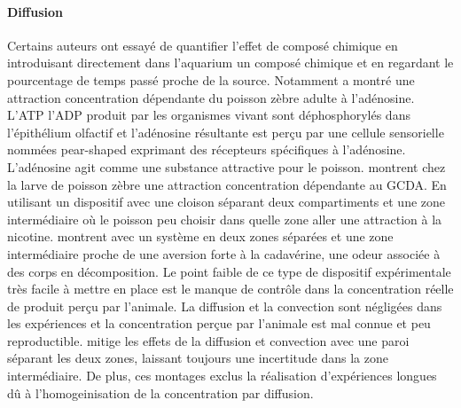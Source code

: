   \paragraph{Diffusion}
  Certains auteurs ont essayé de quantifier l'effet de composé chimique en introduisant directement dans l'aquarium un composé chimique et en regardant le pourcentage de temps passé proche de la source. Notamment \cite{wakisaka2017adenosine} a montré une attraction concentration dépendante du poisson zèbre adulte à l'adénosine. L'ATP l'ADP produit par les organismes vivant sont déphosphorylés dans l'épithélium olfactif et l'adénosine résultante est perçu par une cellule sensorielle nommées pear-shaped exprimant des récepteurs spécifiques à l'adénosine. L'adénosine agit comme une substance attractive pour le poisson. \cite{krishnan2014right} montrent chez la larve de poisson zèbre une attraction concentration dépendante au GCDA. En utilisant un dispositif avec une cloison séparant deux compartiments et une zone intermédiaire où le poisson peu choisir dans quelle zone aller une attraction à la nicotine. \cite{hussain2013high} montrent avec un système en deux zones séparées et une zone intermédiaire proche de \cite{krishnan2014right} une aversion forte à la cadavérine, une odeur associée à des corps en décomposition.
  \medbreak
  Le point faible de ce type de dispositif expérimentale très facile à mettre en place est le manque de contrôle dans la concentration réelle de produit perçu par l'animale. La diffusion et la convection sont négligées dans les expériences et la concentration perçue par l'animale est mal connue et peu reproductible. \cite{hussain2013high,krishnan2014right} mitige les effets de la diffusion et convection avec une paroi séparant les deux zones, laissant toujours une incertitude dans la zone intermédiaire. De plus, ces montages exclus la réalisation d'expériences longues dû à l'homogeinisation de la concentration par diffusion. 
